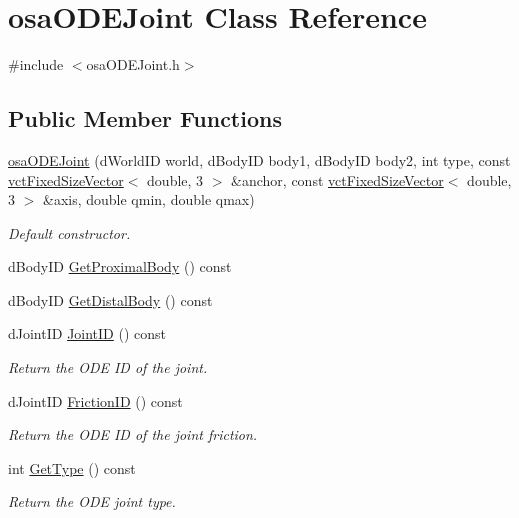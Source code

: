 \hypertarget{classosa_o_d_e_joint}{}\section{osa\+O\+D\+E\+Joint Class Reference}
\label{classosa_o_d_e_joint}


{\ttfamily \#include $<$osa\+O\+D\+E\+Joint.\+h$>$}

\subsection*{Public Member Functions}
\begin{DoxyCompactItemize}
\item 
\hyperlink{classosa_o_d_e_joint_a01489275c6a1ab57359f49e189f10d07}{osa\+O\+D\+E\+Joint} (d\+World\+I\+D world, d\+Body\+I\+D body1, d\+Body\+I\+D body2, int type, const \hyperlink{classvct_fixed_size_vector}{vct\+Fixed\+Size\+Vector}$<$ double, 3 $>$ \&anchor, const \hyperlink{classvct_fixed_size_vector}{vct\+Fixed\+Size\+Vector}$<$ double, 3 $>$ \&axis, double qmin, double qmax)
\begin{DoxyCompactList}\small\item\em Default constructor. \end{DoxyCompactList}\item 
d\+Body\+I\+D \hyperlink{classosa_o_d_e_joint_ada594795933cf305745653e45da24139}{Get\+Proximal\+Body} () const 
\item 
d\+Body\+I\+D \hyperlink{classosa_o_d_e_joint_ace39db9584bc1426f42dc7385d591cc7}{Get\+Distal\+Body} () const 
\item 
d\+Joint\+I\+D \hyperlink{classosa_o_d_e_joint_a22c29049b63c6bcb3b0a356619a406d4}{Joint\+I\+D} () const 
\begin{DoxyCompactList}\small\item\em Return the O\+D\+E I\+D of the joint. \end{DoxyCompactList}\item 
d\+Joint\+I\+D \hyperlink{classosa_o_d_e_joint_a627b7b5970fb1dda011cd3799fd07d38}{Friction\+I\+D} () const 
\begin{DoxyCompactList}\small\item\em Return the O\+D\+E I\+D of the joint friction. \end{DoxyCompactList}\item 
int \hyperlink{classosa_o_d_e_joint_a03d31a848567b0c2e83cc6d6a69c33a0}{Get\+Type} () const 
\begin{DoxyCompactList}\small\item\em Return the O\+D\+E joint type. \end{DoxyCompactList}\item 

\end{DoxyCompactItemize}
